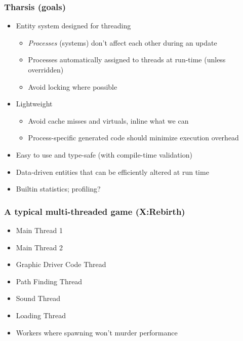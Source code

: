 \documentclass[ignorenonframetext,]{beamer}
\begin{document}
\begin{frame}\frametitle{Tharsis (goals)}

\begin{itemize}
\item
  Entity system designed for threading
  \begin{itemize}
  \item
    \emph{Processes} (systems) don't affect each other during an update
  \item
    Processes automatically assigned to threads at run-time (unless overridden)
  \item
    Avoid locking where possible
  \end{itemize}
\item
  Lightweight
  \begin{itemize}
  \item
    Avoid cache misses and virtuals, inline what we can
  \item
    Process-specific generated code should minimize execution overhead
  \end{itemize}

\item
  Easy to use and type-safe (with compile-time validation)
\item
  Data-driven entities that can be efficiently altered at run time
\item
  Builtin statistics; profiling?
\end{itemize}

\end{frame}

\begin{frame}\frametitle{A typical multi-threaded game (X:Rebirth)}

\begin{itemize}
\item
  Main Thread 1
\item
  Main Thread 2
\item
  Graphic Driver Code Thread
\item
  Path Finding Thread
\item
  Sound Thread
\item
  Loading Thread
\item
  Workers where spawning won't murder performance
\end{itemize}

\end{frame}
\end{document}
